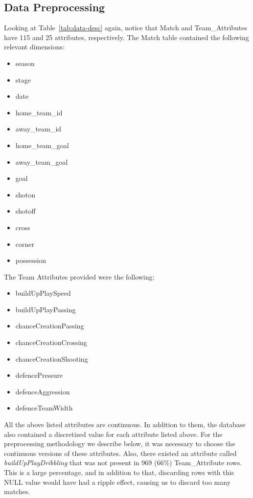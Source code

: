 \documentclass[11pt]{article}
\begin{document}
\subsection{Data Preprocessing}
\label{sec:preprocessing}
Looking at Table~\ref{tab:data-desc} again, notice that Match and Team\_Attributes have 115 and 25 attributes, respectively.
The Match table contained the following relevant dimensions:
\begin{itemize}
  \setlength\itemsep{0em}
  \item season
  \item stage
  \item date
  \item home\_team\_id
  \item away\_team\_id
  \item home\_team\_goal
  \item away\_team\_goal
  \item goal
  \item shoton
  \item shotoff
  \item cross
  \item corner
  \item possession
\end{itemize}

The Team Attributes provided were the following:
\begin{itemize}
  \setlength \itemsep{0em}
  \item buildUpPlaySpeed
  \item buildUpPlayPassing
  \item chanceCreationPassing
  \item chanceCreationCrossing
  \item chanceCreationShooting
  \item defencePressure
  \item defenceAggression
  \item defenceTeamWidth
\end{itemize}

All the above listed attributes are continuous.
In addition to them, the database also contained a discretized value for each attribute listed above.
For the preprocessing methodology we describe below, it was necessary to choose the continuous versions of these attributes.
Also, there existed an attribute called \textit{buildUpPlayDribbling} that was not present in 969 (66\%) Team\_Attribute rows.
This is a large percentage, and in addition to that, discarding rows with this NULL value would have had a ripple effect, causing us to discard too many matches.
\end{document}
